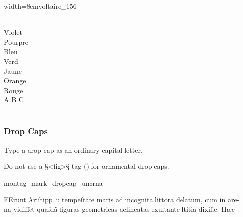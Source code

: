 \begin{sampleImageSmall}{width=8cm}{voltaire_156}
\begin{typeLatin}
 \\
Violet \\
Pourpre \\
Bleu \\
Verd \\
Jaune \\
Orange \\
Rouge \\
A B C \\
 \\
\end{typeLatin}
\end{sampleImageSmall}


\subsubsection{Drop Caps}
\label{section drop caps}

\begin{mainrule}
Type a drop cap as an ordinary capital letter.
\end{mainrule}

\begin{clarification}
Do not use a §<fig>§ tag () for ornamental drop caps.
\end{clarification}

\vspace{2mm}
\begin{sampleImage}{montag_mark_dropcap_unorna}
\begin{typeLatin}
FErunt Ariſtipp\bs~u tempeſtate maris ad incognita littora delatum, cum in are-\\
na vidiſſet quaſdã figuras geometricas delineatas exultant\bs\tld{}e ltitia dixiſſe: Hæc\\
\someText {}
\end{typeLatin}
\end{sampleImage}

